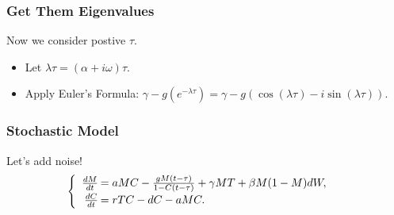 \documentclass{beamer}
\begin{document}
\begin{frame}\frametitle{Get Them Eigenvalues}
Now we consider postive $\tau$.
\begin{itemize}
\item Let $\lambda \tau=(\alpha+i\omega)\tau$.
\item Apply Euler's Formula: $\gamma-g(e^{-\lambda\tau})=\gamma-g(\cos(\lambda\tau)-i\sin(\lambda\tau))$.
\end{itemize}
\end{frame}

\begin{frame}
\frametitle{Stochastic Model}
Let's add noise!
$$\begin{cases}
\begin{array}{rl}
\frac{dM}{dt}\hspace{-.8em}&=aMC - \frac{gM(t-\tau)}{1-C(t-\tau)}+\gamma M T+\beta M(1-M)dW,\\
\frac{dC}{dt}\hspace{-.8em}&=rTC - dC - aMC.\\
\end{array}
\end{cases}$$
\end{frame}

\end{document}
